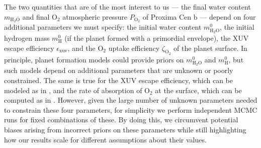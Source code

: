 \documentclass[]{emulateapj}
\begin{document}
The two quantities that are of the most interest to us --- the final water content $m_\mathrm{H_2O}$ and final O$_2$ atmospheric 
pressure $P_\mathrm{O_2}$ of Proxima Cen b --- depend on four additional parameters we must specify: the initial water content $m_\mathrm{H_2O}^0$, the initial hydrogen 
mass $m_\mathrm{H}^0$ (if the planet formed with a primordial envelope), the XUV escape efficiency $\epsilon_\mathrm{xuv}$, and
the O$_2$ uptake efficiency $\zeta_\mathrm{O_2}$ of the planet surface. In principle, planet formation models could provide
priors on $m_\mathrm{H_2O}^0$ and $m_\mathrm{H}^0$, but such models depend on additional parameters that are unknown or poorly 
constrained. The same is true for the XUV escape efficiency, which can be modeled as in \cite{Ribas16}, and the rate of
absorption of O$_2$ at the surface, which can be computed as in \cite{Schaefer2016}. However, given the large number of unknown
parameters needed to constrain these four parameters, for simplicity we perform independent MCMC runs for fixed combinations
of these. By doing this, we circumvent potential biases arising from incorrect priors on these parameters while still
highlighting how our results scale for different assumptions about their values.
\end{document}
